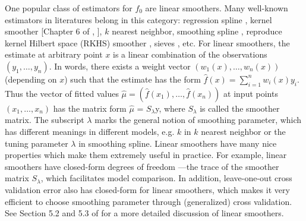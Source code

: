 \documentclass[a4paper]{article}
\begin{document}
One popular class of estimators for $f_0$ are linear smoothers. Many well-known estimators in literatures belong in this category: regression spline \cite{carl1978practical}, kernel smoother [Chapter 6 of \cite{friedman2001elements}, \cite{loader2006local}], $k$ nearest neighbor, smoothing spline \cite{carl1978practical,wahba1990spline,green1993nonparametric}, reproduce kernel Hilbert space (RKHS) smoother \cite{smola1998learning,wahba1990spline}, sieves \cite{shen1994convergence,wong1995probability}, etc.  For linear smoothers, the estimate at arbitrary point $x$ is a linear combination of the observations $(y_1,\ldots, y_n)$. In words, there exists a weight vector $(w_1(x), \ldots, w_n(x))$ (depending on $x$) such that the estimate has the form $\hat{f}(x) = \sum_{i=1}^n w_i(x)y_i$. Thus the vector of fitted values $\hat{\mu} = (\hat{f}(x_1), \ldots, \hat{f}(x_n))$ at input points $(x_1, \ldots, x_n)$ has the matrix form $\hat{\mu}$ = $S_\lambda$y, where $S_\lambda$ is called the smoother matrix. The subscript $\lambda$ marks the general notion of smoothing parameter, which has different meanings in different models, e.g. $k$ in $k$ nearest neighbor or the tuning parameter $\lambda$ in smoothing spline. Linear smoothers have many nice properties which make them extremely useful in practice. For example, linear smoothers have closed-form degrees of freedom \cite{efron1986biased}---the trace of the smoother matrix $S_\lambda$, which facilitates model comparison. In addition, leave-one-out cross validation error also has closed-form for linear smoothers, which makes it very efficient to choose smoothing parameter through (generalized) cross validation. See Section 5.2 and 5.3 of \cite{wasserman2007all} for a more detailed discussion of linear smoothers.
\end{document}
